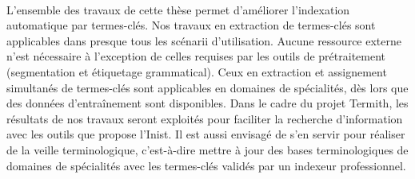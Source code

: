     ~\\L'ensemble des travaux de cette thèse permet d'améliorer l'indexation
    automatique par termes-clés. Nos travaux en extraction de termes-clés sont
    applicables dans presque tous les scénarii d'utilisation. Aucune ressource
    externe n'est nécessaire à l'exception de celles requises par les outils de
    prétraitement (segmentation et étiquetage grammatical). Ceux en
    extraction et assignement simultanés de termes-clés sont applicables en
    domaines de spécialités, dès lors que des données d'entraînement sont
    disponibles. Dans le cadre du projet Termith, les résultats de nos travaux
    seront exploités pour faciliter la recherche d'information avec les outils
    que propose l'Inist. Il est aussi envisagé de s'en servir pour réaliser de
    la veille terminologique, c'est-à-dire mettre à jour des bases
    terminologiques de domaines de spécialités avec les termes-clés validés par
    un indexeur professionnel.


